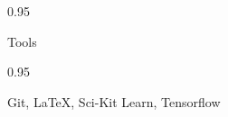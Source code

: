 \documentclass[a4paper,9pt]{article}
\newcommand{\doubleColumnGap}{\hspace{4mm}}
\newcommand{\mainLineSpacing}{0.95}
\begin{document}
\begin{minipage}[t]{0.20\linewidth}
  \begin{small}
    \begin{spacing}\mainLineSpacing{}
      \begin{flushright}
        Tools
      \end{flushright}
    \end{spacing}
  \end{small}
\end{minipage}
\doubleColumnGap{}
\begin{minipage}[t]{0.75\linewidth}
  \begin{small}
    \begin{spacing}\mainLineSpacing{}
      \begin{flushleft}
        Git, \LaTeX, Sci-Kit Learn, Tensorflow
      \end{flushleft}
    \end{spacing}
  \end{small}
\end{minipage}
\end{document}
